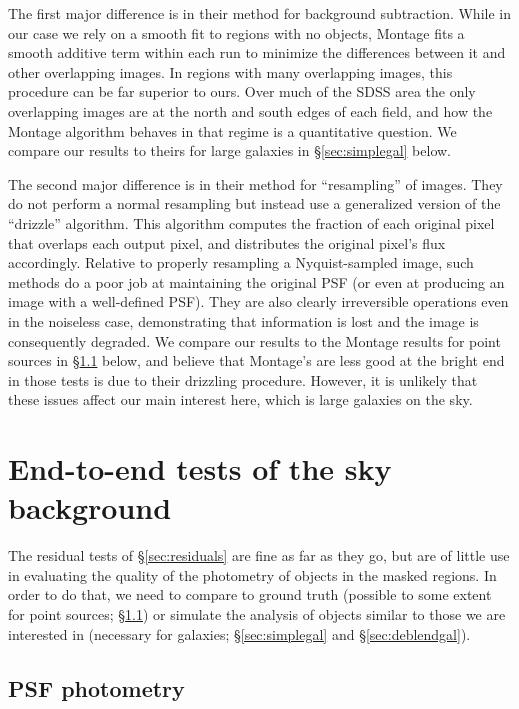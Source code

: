 \documentclass[10pt,preprint]{aastex}
\begin{document}
The first major difference is in their method for background
subtraction. While in our case we rely on a smooth fit to regions with
no objects, Montage fits a smooth additive term within each run to
minimize the differences between it and other overlapping images. In
regions with many overlapping images, this procedure can be far
superior to ours. Over much of the SDSS area the only overlapping
images are at the north and south edges of each field, and how the
Montage algorithm behaves in that regime is a quantitative
question. We compare our results to theirs for large galaxies in
\S\ref{sec:simplegal} below.

The second major difference is in their method for ``resampling'' of
images. They do not perform a normal resampling but instead use a
generalized version of the ``drizzle'' algorithm. This algorithm
computes the fraction of each original pixel that overlaps each output
pixel, and distributes the original pixel's flux accordingly. Relative
to properly resampling a Nyquist-sampled image, such methods do a poor
job at maintaining the original PSF (or even at producing an image
with a well-defined PSF). They are also clearly irreversible
operations even in the noiseless case, demonstrating that information
is lost and the image is consequently degraded. We compare our results
to the Montage results for point sources in \S\ref{sec:psfs} below,
and believe that Montage's are less good at the bright end in those
tests is due to their drizzling procedure. However, it is unlikely
that these issues affect our main interest here, which is large
galaxies on the sky.

\section{End-to-end tests of the sky background}
\label{sec:endtoend}

The residual tests of \S\ref{sec:residuals} are fine as far as they
go, but are of little use in evaluating the quality of the photometry
of objects in the masked regions.  In order to do that, we need to
compare to ground truth (possible to some extent for point sources;
\S\ref{sec:psfs}) or simulate the analysis of objects similar to those
we are interested in (necessary for galaxies; \S\ref{sec:simplegal}
and \S\ref{sec:deblendgal}).

\subsection{PSF photometry}
\label{sec:psfs}
\end{document}
